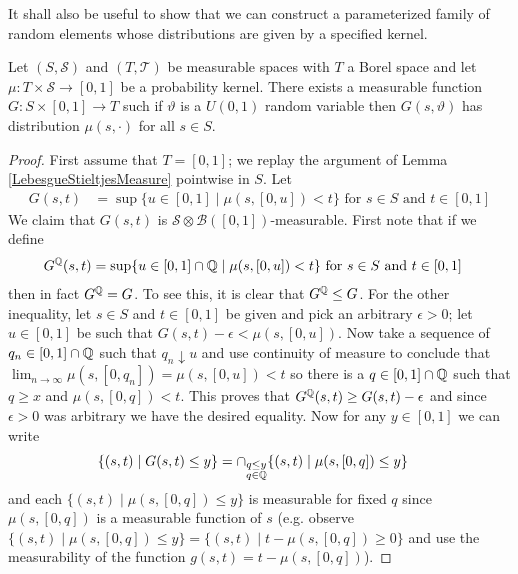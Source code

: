 It shall also be useful to show that we can construct a parameterized
family of random elements whose distributions are given by a specified
kernel.
\begin{lem}\label{RandomizationAndKernels}Let $(S,\mathcal{S})$ and $(T, \mathcal{T})$ be measurable
  spaces with $T$ a Borel space and let $\mu : T \times \mathcal{S}
  \to [0,1]$ be a probability kernel.  There exists a measurable
  function $G : S \times [0,1] \to T$ such if $\vartheta$ is a
  $U(0,1)$ random variable then $G(s, \vartheta)$ has distribution
  $\mu(s, \cdot)$ for all $s \in S$.
\end{lem}
\begin{proof}
First assume that $T = [0,1]$; we replay the argument of
Lemma \ref{LebesgueStieltjesMeasure} pointwise in $S$.  
Let 
\begin{align*}
G(s, t) &= \sup \lbrace u \in [0,1] \mid \mu(s,[0,u]) < t \rbrace
\text{ for $s \in S$ and $t \in [0,1]$}
\end{align*}
We claim that $G(s,t)$ is $\mathcal{S} \otimes
\mathcal{B}([0,1])$-measurable.  First note that if we define
\begin{align*}
G^{\mathbb{Q}} (s, t) &= \sup \lbrace u \in [0,1] \cap \mathbb{Q} \mid \mu(s,[0,u]) < t \rbrace
\text{ for $s \in S$ and $t \in [0,1]$}
\end{align*}
then in fact $G^{\mathbb{Q}} = G$.  To see this, it is clear that
$G^{\mathbb{Q}} \leq G$.  For the other inequality, let $s \in S$ and
$t \in [0,1]$ be given and pick an arbitrary $\epsilon > 0$;  let $u
\in [0,1]$ be such that $G(s,t) - \epsilon < \mu(s,[0,u])$.  Now take
a sequence of $q_n \in [0,1] \cap \mathbb{Q}$ such that $q_n
\downarrow u$ and use continuity of measure to conclude that $\lim_{n
  \to \infty } \mu(s, [0,q_n]) = \mu(s, [0,u]) < t$ so there is a $q \in
  [0,1] \cap \mathbb{Q}$ such that $q \geq x$ and $\mu(s,[0,q]) < t$.
  This proves that $G^{\mathbb{Q}}(s,t) \geq G(s,t) - \epsilon$ and since
  $\epsilon > 0$ was arbitrary we have the desired equality.  Now for
  any $y \in [0,1]$ we can write
\begin{align*}
\lbrace (s,t) \mid G(s,t) \leq y \rbrace &= \cap_{\substack{q \leq y
    \\ q \in \mathbb{Q}}} \lbrace (s,t) \mid \mu(s,
[0, q] ) \leq y \rbrace
\end{align*}
and each $\lbrace (s,t) \mid \mu(s,[0, q]) \leq y \rbrace$ is
measurable for fixed $q$ since $\mu(s,[0,q])$ is a measurable function
of $s$ (e.g. observe $\lbrace (s,t) \mid \mu(s,[0, q]) \leq y \rbrace
= \lbrace (s,t) \mid t - \mu(s,[0, q]) \geq 0 \rbrace$ and use the
measurability of the function $g(s,t) = t - \mu(s,[0, q])$).


\end{proof}
